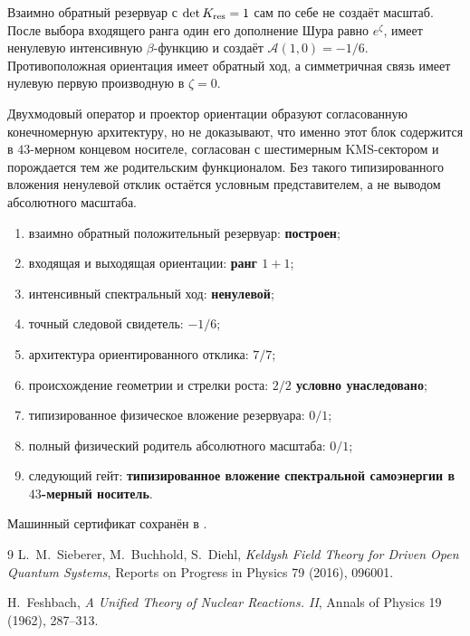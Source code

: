 \begin{theorem}
Взаимно обратный резервуар с $\det K_{\rm res}=1$ сам по себе не создаёт
масштаб. После выбора входящего ранга один его дополнение Шура равно
$e^{\zeta}$, имеет ненулевую интенсивную $\beta$-функцию и создаёт
$\mathcal A(1,0)=-1/6$. Противоположная ориентация имеет обратный ход, а
симметричная связь имеет нулевую первую производную в $\zeta=0$.
\end{theorem}

\begin{nogocriterion}
Двухмодовый оператор и проектор ориентации образуют согласованную
конечномерную архитектуру, но не доказывают, что именно этот блок содержится
в $43$-мерном концевом носителе, согласован с шестимерным KMS-сектором и
порождается тем же родительским функционалом. Без такого типизированного
вложения ненулевой отклик остаётся условным представителем, а не выводом
абсолютного масштаба.
\end{nogocriterion}

\begin{protocol}\begin{enumerate}
\item взаимно обратный положительный резервуар: \textbf{построен};
\item входящая и выходящая ориентации: \textbf{ранг $1+1$};
\item интенсивный спектральный ход: \textbf{ненулевой};
\item точный следовой свидетель: \textbf{$-1/6$};
\item архитектура ориентированного отклика: \textbf{$7/7$};
\item происхождение геометрии и стрелки роста: \textbf{$2/2$ условно
унаследовано};
\item типизированное физическое вложение резервуара: \textbf{$0/1$};
\item полный физический родитель абсолютного масштаба: \textbf{$0/1$};
\item следующий гейт: \textbf{типизированное вложение спектральной
самоэнергии в $43$-мерный носитель}.
\end{enumerate}\end{protocol}

Машинный сертификат сохранён в
.

\begin{thebibliography}{9}
L.~M.~Sieberer, M.~Buchhold, S.~Diehl,
\emph{Keldysh Field Theory for Driven Open Quantum Systems},
Reports on Progress in Physics 79 (2016), 096001.

H.~Feshbach,
\emph{A Unified Theory of Nuclear Reactions. II},
Annals of Physics 19 (1962), 287--313.
\end{thebibliography}